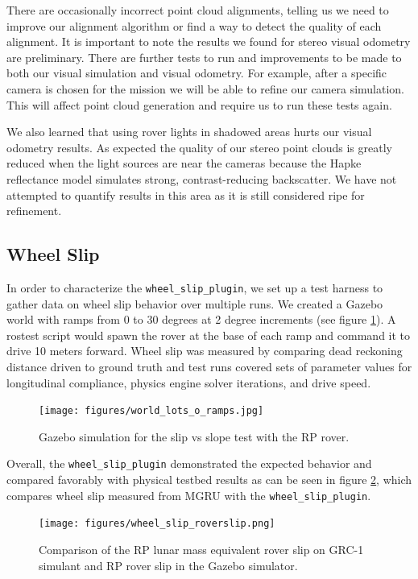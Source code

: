 \documentclass[twocolumn,letterpaper]{IEEEAerospaceCLS}  %
\begin{document}
There are occasionally incorrect point cloud alignments, telling us we need to improve our alignment algorithm or find a way to detect the quality of each alignment.
It is important to note the results we found for stereo visual odometry are preliminary. 
There are further tests to run and improvements to be made to both our visual simulation and visual odometry. 
For example, after a specific camera is chosen for the mission we will be able to refine our camera simulation. 
This will affect point cloud generation and require us to run these tests again.

We also learned that using rover lights in shadowed areas hurts our visual odometry results. 
As expected the quality of our stereo point clouds is greatly reduced when the light sources are near the cameras because the Hapke reflectance model simulates strong, contrast-reducing backscatter. 
We have not attempted to quantify results in this area as it is still considered ripe for refinement.

\subsection{Wheel Slip}
In order to characterize the \texttt{wheel\_slip\_plugin}, we set up a test harness to gather data on wheel slip behavior over multiple runs. 
We created a Gazebo world with ramps from 0 to 30 degrees at 2 degree increments (see figure \ref{fig:simulationramps}). 
A rostest script would spawn the rover at the base of each ramp and command it to drive 10 meters forward.
Wheel slip was measured by comparing dead reckoning distance driven to ground truth and test runs covered sets of parameter values for longitudinal compliance, physics engine solver iterations, and drive speed. 
\begin{figure}[h!]
	\texttt{[image: figures/world\_lots\_o\_ramps.jpg]}
   	\caption{Gazebo simulation for the slip vs slope test with the RP rover.}
    \label{fig:simulationramps}
\end{figure}
Overall, the \texttt{wheel\_slip\_plugin} demonstrated the expected behavior and compared favorably with physical testbed results as can be seen in figure \ref{fig:wheelsliptuningchart}, which compares wheel slip measured from MGRU with the  \texttt{wheel\_slip\_plugin}. 
\begin{figure}[h!]
	\texttt{[image: figures/wheel\_slip\_roverslip.png]}
   	\caption{Comparison of the RP lunar mass equivalent rover slip on GRC-1 simulant and RP rover slip in the Gazebo simulator.}
    \label{fig:wheelsliptuningchart}
\end{figure}
\end{document}
